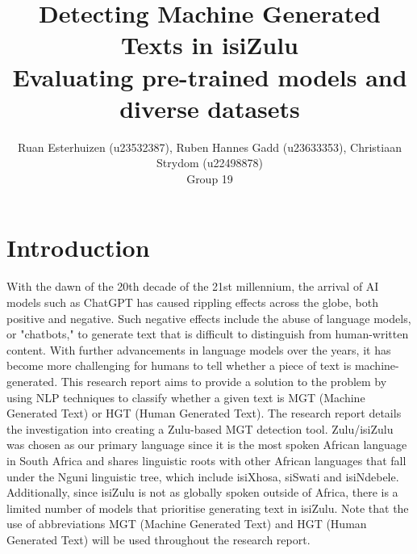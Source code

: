 \documentclass[11pt]{article}
\title{Detecting Machine Generated Texts in isiZulu \\[1ex] \large Evaluating pre-trained models and diverse datasets}
\author{Ruan Esterhuizen (u23532387), Ruben Hannes Gadd (u23633353), Christiaan Strydom (u22498878) \\[1ex] \large Group 19}
\date{}
\begin{document}
    \maketitle

    \section{Introduction}
    With the dawn of the 20th decade of the 21st millennium, the arrival of AI models such 
    as ChatGPT has caused rippling effects across the globe, both positive and negative. 
    Such negative effects include the abuse of language models, or "chatbots," to 
    generate text that is difficult to distinguish from human-written content. With 
    further advancements in language models over the years, it has become more challenging 
    for humans to tell whether a piece of text is machine-generated. This research report 
    aims to provide a solution to the problem by using NLP techniques to classify whether 
    a given text is MGT (Machine Generated Text) or HGT (Human Generated Text). The research 
    report details the investigation into creating a Zulu-based MGT detection tool. 
    Zulu/isiZulu was chosen as our primary language since it is the most spoken African 
    language in South Africa and shares linguistic roots with other African languages 
    that fall under the Nguni linguistic tree, which include isiXhosa, siSwati and isiNdebele. 
    Additionally, since isiZulu is not as globally spoken outside of Africa, there is a limited 
    number of models that prioritise generating text in isiZulu. Note that the use of abbreviations 
    MGT (Machine Generated Text) and HGT (Human Generated Text) will be used throughout the 
    research report.
\end{document}

